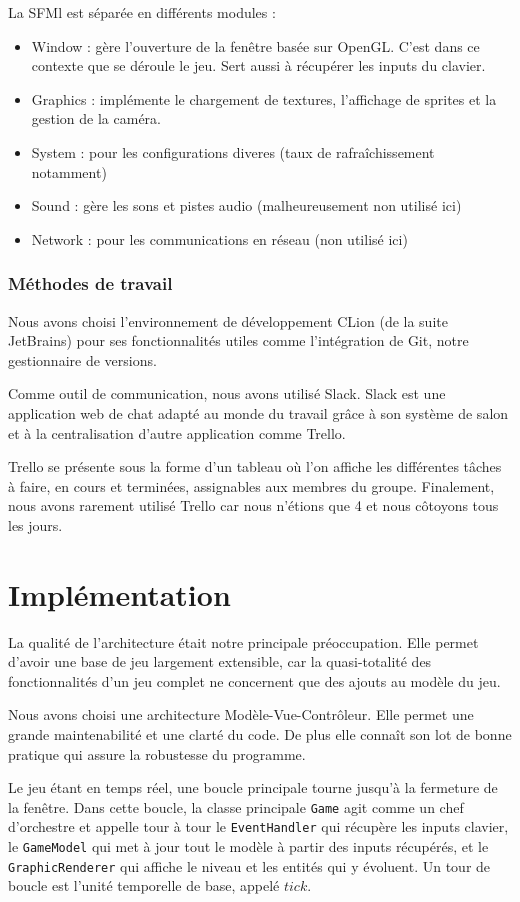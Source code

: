 \documentclass[a4paper,11pt]{article}
\begin{document}
La SFMl est séparée en différents modules :
\begin{itemize}
\item Window : gère l'ouverture de la fenêtre basée sur OpenGL. C'est dans ce contexte que se déroule le jeu. Sert aussi à récupérer les inputs du clavier.
\item Graphics : implémente le chargement de textures, l'affichage de sprites et la gestion de la caméra.
\item System : pour les configurations diveres (taux de rafraîchissement notamment)
\item Sound : gère les sons et pistes audio (malheureusement non utilisé ici)
\item Network : pour les communications en réseau (non utilisé ici)
\end{itemize}

\subsubsection*{Méthodes de travail}
Nous avons choisi l'environnement de développement CLion (de la suite JetBrains) pour ses fonctionnalités utiles comme l'intégration de Git, notre gestionnaire de versions.

Comme outil de communication, nous avons utilisé Slack. Slack est une application web de chat adapté au monde du travail grâce à son système de salon et à la centralisation d'autre application comme Trello.

Trello se présente sous la forme d'un tableau où l'on affiche les différentes tâches à faire, en cours et terminées, assignables aux membres du groupe.
Finalement, nous avons rarement utilisé Trello car nous n'étions que 4 et nous côtoyons tous les jours.

\section{Implémentation}
La qualité de l'architecture était notre principale préoccupation. Elle permet d'avoir une base de jeu largement extensible, car la quasi-totalité des fonctionnalités d'un jeu complet ne concernent que des ajouts au modèle du jeu.

Nous avons choisi une architecture Modèle-Vue-Contrôleur. Elle permet une grande maintenabilité et une clarté du code. De plus elle connaît son lot de bonne pratique qui assure la robustesse du programme.

Le jeu étant en temps réel, une boucle principale tourne jusqu'à la fermeture de la fenêtre. Dans cette boucle, la classe principale \texttt{Game} agit comme un chef d'orchestre et appelle tour à tour le \texttt{EventHandler} qui récupère les inputs clavier, le \texttt{GameModel} qui met à jour tout le modèle à partir des inputs récupérés, et le \texttt{GraphicRenderer} qui affiche le niveau et les entités qui y évoluent. Un tour de boucle est l'unité temporelle de base, appelé $tick$.
\end{document}
